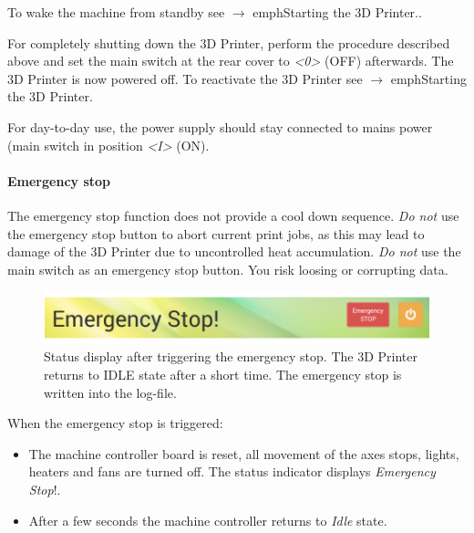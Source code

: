 To wake the machine from standby see $\rightarrow$ emph{Starting the 3D Printer}.. 

For completely shutting down the 3D Printer, perform the procedure described above and set the main switch at the rear cover to \emph{<0>} (OFF) afterwards. The 3D Printer is now powered off.
To reactivate the 3D Printer see $\rightarrow$ emph{Starting the 3D Printer}. 

\begin{info}
  For day-to-day use, the power supply should stay connected to mains power (main switch in position \emph{<I>} (ON). 
\end{info}


\paragraph{Emergency stop}

\begin{notice}
  The emergency stop function does not provide a cool down sequence. \emph{Do not} use the emergency stop button to abort current print jobs, as this may lead to damage of the 3D Printer due to uncontrolled heat accumulation. \emph{Do not} use the main switch as an emergency stop button. You risk loosing or corrupting data. 
\end{notice}

\begin{figure}[H]
  \centering
  \includegraphics[width=.7\linewidth]{./img/gui_v110_emergencystoptriggered.png}
  \caption{Status display after triggering the emergency stop. The 3D Printer 
           returns to IDLE state after a short time. The emergency stop is written into the log-file. }
\end{figure}

When the emergency stop is triggered:

\begin{itemize}    
  \item The machine controller board is reset, all movement of the axes stops, lights, 
        heaters and fans are turned off. The status indicator displays
        \emph{Emergency Stop}!.
  \item After a few seconds the machine controller returns to \emph{Idle} state.
\end{itemize}

